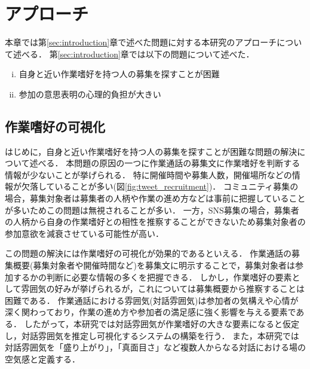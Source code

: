 \chapter{アプローチ\label{sec:approach}}
\thispagestyle{plain}

本章では第\ref{sec:introduction}章で述べた問題に対する本研究のアプローチについて述べる．
第\ref{sec:introduction}章では以下の問題について述べた．

\begin{enumerate}[i.]
    \item 自身と近い作業嗜好を持つ人の募集を探すことが困難
    \item 参加の意思表明の心理的負担が大きい
\end{enumerate}

\section{作業嗜好の可視化\label{node:approach_i}}

はじめに，自身と近い作業嗜好を持つ人の募集を探すことが困難な問題の解決について述べる．
本問題の原因の一つに作業通話の募集文に作業嗜好を判断する情報が少ないことが挙げられる．
特に開催時間や募集人数，開催場所などの情報が欠落していることが多い(図\ref{fig:tweet_recruitment})．
コミュニティ募集の場合，募集対象者は募集者の人柄や作業の進め方などは事前に把握していることが多いためこの問題は無視されることが多い．
一方，SNS募集の場合，募集者の人柄から自身の作業嗜好との相性を推察することができないため募集対象者の参加意欲を減衰させている可能性が高い．

この問題の解決には作業嗜好の可視化が効果的であるといえる．
作業通話の募集概要(募集対象者や開催時間など)を募集文に明示することで，募集対象者は参加するかの判断に必要な情報の多くを把握できる．
しかし，作業嗜好の要素として雰囲気の好みが挙げられるが，これについては募集概要から推察することは困難である．
作業通話における雰囲気(対話雰囲気)は参加者の気構えや心情が深く関わっており，作業の進め方や参加者の満足感に強く影響を与える要素である．
したがって，本研究では対話雰囲気が作業嗜好の大きな要素になると仮定し，対話雰囲気を推定し可視化するシステムの構築を行う．
また，本研究では対話雰囲気を「盛り上がり」，「真面目さ」など複数人からなる対話における場の空気感と定義する．

